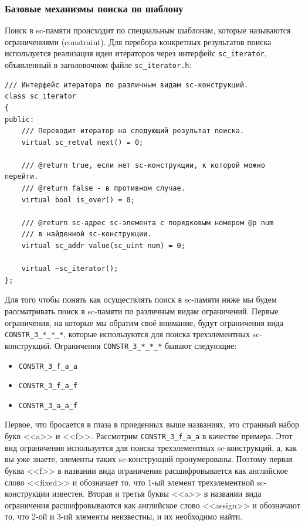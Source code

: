\subsubsection{Базовые механизмы поиска по шаблону}

Поиск в sc-памяти происходит по специальным шаблонам, которые
называются ограничениями (constraint). Для перебора конкретных
результатов поиска используется реализация идеи итераторов через
интерфейс \lstinline|sc_iterator|, объявленный в заголовочном файле
\verb|sc_iterator.h|:
\begin{lstlisting}[texcl]
/// Интерфейс итератора по различным видам sc-конструкций.
class sc_iterator
{
public:
    /// Переводит итератор на следующий результат поиска.
    virtual sc_retval next() = 0;

    /// @return true, если нет sc-конструкции, к которой можно перейти.
    /// @return false - в противном случае.
    virtual bool is_over() = 0;

    /// @return sc-адрес sc-элемента с порядковым номером @p num
    /// в найденной sc-конструкции.
    virtual sc_addr value(sc_uint num) = 0;

    virtual ~sc_iterator();
};
\end{lstlisting}

Для того чтобы понять как осуществлять поиск в sc-памяти ниже мы будем
рассматривать поиск в sc-памяти по различным видам ограничений. Первые
ограничения, на которые мы обратим своё внимание, будут ограничения
вида \lstinline|CONSTR_3_*_*_*|, которые используются для поиска трехэлементных
sc-конструкций. Ограничения \lstinline|CONSTR_3_*_*_*| бывают следующие:
\begin{itemize}
\item \lstinline|CONSTR_3_f_a_a|
\item \lstinline|CONSTR_3_f_a_f|
\item \lstinline|CONSTR_3_a_a_f|
\end{itemize}

Первое, что бросается в глаза в приеденных выше названиях, это
странный набор букв <<a>> и <<f>>. Рассмотрим
\lstinline|CONSTR_3_f_a_a| в качестве примера. Этот вид ограничения
используется для поиска трехэлементных sc-конструкций, а, как вы уже
знаете, элементы таких sc-конструкций пронумерованы. Поэтому первая
буква <<f>> в названии вида ограничения расшифровывается как
английское слово <<fixed>> и обозначает то, что 1-ый элемент
трехэлементной sc-конструкции известен. Вторая и третья буквы <<a>> в
названии вида ограничения расшифровываются как английское слово
<<assign>> и обозначают то, что 2-ой и 3-ий элементы неизвестны, и их
необходимо найти.

